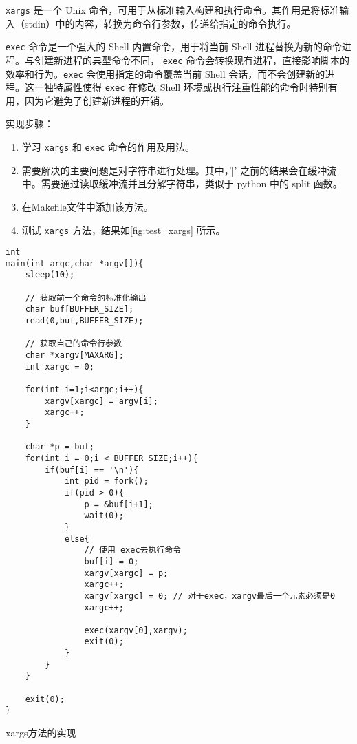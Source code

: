 \texttt{xargs} 是一个 Unix 命令，可用于从标准输入构建和执行命令。其作用是将标准输入（stdin）中的内容，转换为命令行参数，传递给指定的命令执行。

\texttt{exec} 命令是一个强大的 Shell 内置命令，用于将当前 Shell 进程替换为新的命令进程。与创建新进程的典型命令不同， \texttt{exec} 命令会转换现有进程，直接影响脚本的效率和行为。\texttt{exec} 会使用指定的命令覆盖当前 Shell 会话，而不会创建新的进程。这一独特属性使得 \texttt{exec} 在修改 Shell 环境或执行注重性能的命令时特别有用，因为它避免了创建新进程的开销。

实现步骤：
\begin{enumerate}
	\item 学习 \texttt{xargs} 和 \texttt{exec} 命令的作用及用法。
	\item 需要解决的主要问题是对字符串进行处理。其中，'|' 之前的结果会在缓冲流中。需要通过读取缓冲流并且分解字符串，类似于 python 中的 split 函数。
	\item 在Makefile文件中添加该方法。
	\item 测试 \texttt{xargs} 方法，结果如\cref{fig:test_xargs} 所示。
\end{enumerate}

\begin{listing}[!htb]
	\begin{verbatim}
int
main(int argc,char *argv[]){
    sleep(10);
    
    // 获取前一个命令的标准化输出
    char buf[BUFFER_SIZE];
    read(0,buf,BUFFER_SIZE);

    // 获取自己的命令行参数
    char *xargv[MAXARG];
    int xargc = 0;

    for(int i=1;i<argc;i++){
        xargv[xargc] = argv[i];
        xargc++;
    }

    char *p = buf;
    for(int i = 0;i < BUFFER_SIZE;i++){
        if(buf[i] == '\n'){
            int pid = fork();
            if(pid > 0){
                p = &buf[i+1];
                wait(0);
            }
            else{
                // 使用 exec去执行命令
                buf[i] = 0;
                xargv[xargc] = p;
                xargc++;
                xargv[xargc] = 0; // 对于exec，xargv最后一个元素必须是0
                xargc++;

                exec(xargv[0],xargv);
                exit(0);
            }
        }
    }

    exit(0);
}
	\end{verbatim}
	\caption{xargs方法的实现}\label{lst:xargs}
\end{listing}

